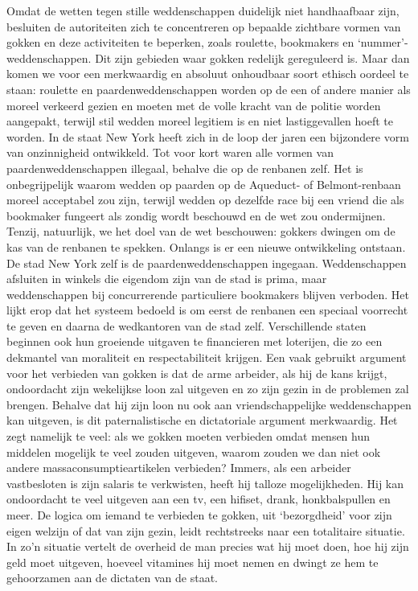 \documentclass[
  a5paper,
  smalldemyvopaper,10pt,twoside,onecolumn,openright,extrafontsizes,hidelinks]{memoir}
\begin{document}
Omdat de wetten tegen stille weddenschappen duidelijk niet handhaafbaar
zijn, besluiten de autoriteiten zich te concentreren op bepaalde
zichtbare vormen van gokken en deze activiteiten te beperken, zoals
roulette, bookmakers en `nummer'-weddenschappen. Dit zijn gebieden waar
gokken redelijk gereguleerd is. Maar dan komen we voor een merkwaardig
en absoluut onhoudbaar soort ethisch oordeel te staan: roulette en
paardenweddenschappen worden op de een of andere manier als moreel
verkeerd gezien en moeten met de volle kracht van de politie worden
aangepakt, terwijl stil wedden moreel legitiem is en niet lastiggevallen
hoeft te worden. In de staat New York heeft zich in de loop der jaren
een bijzondere vorm van onzinnigheid ontwikkeld. Tot voor kort waren
alle vormen van paardenweddenschappen illegaal, behalve die op de
renbanen zelf. Het is onbegrijpelijk waarom wedden op paarden op de
Aqueduct- of Belmont-renbaan moreel acceptabel zou zijn, terwijl wedden
op dezelfde race bij een vriend die als bookmaker fungeert als zondig
wordt beschouwd en de wet zou ondermijnen. Tenzij, natuurlijk, we het
doel van de wet beschouwen: gokkers dwingen om de kas van de renbanen te
spekken. Onlangs is er een nieuwe ontwikkeling ontstaan. De stad New
York zelf is de paardenweddenschappen ingegaan. Weddenschappen afsluiten
in winkels die eigendom zijn van de stad is prima, maar weddenschappen
bij concurrerende particuliere bookmakers blijven verboden. Het lijkt
erop dat het systeem bedoeld is om eerst de renbanen een speciaal
voorrecht te geven en daarna de wedkantoren van de stad zelf.
Verschillende staten beginnen ook hun groeiende uitgaven te financieren
met loterijen, die zo een dekmantel van moraliteit en respectabiliteit
krijgen. Een vaak gebruikt argument voor het verbieden van gokken is dat
de arme arbeider, als hij de kans krijgt, ondoordacht zijn wekelijkse
loon zal uitgeven en zo zijn gezin in de problemen zal brengen. Behalve
dat hij zijn loon nu ook aan vriendschappelijke weddenschappen kan
uitgeven, is dit paternalistische en dictatoriale argument merkwaardig.
Het zegt namelijk te veel: als we gokken moeten verbieden omdat mensen
hun middelen mogelijk te veel zouden uitgeven, waarom zouden we dan niet
ook andere massaconsumptieartikelen verbieden? Immers, als een arbeider
vastbesloten is zijn salaris te verkwisten, heeft hij talloze
mogelijkheden. Hij kan ondoordacht te veel uitgeven aan een tv, een
hifiset, drank, honkbalspullen en meer. De logica om iemand te verbieden
te gokken, uit `bezorgdheid' voor zijn eigen welzijn of dat van zijn
gezin, leidt rechtstreeks naar een totalitaire situatie. In zo'n
situatie vertelt de overheid de man precies wat hij moet doen, hoe hij
zijn geld moet uitgeven, hoeveel vitamines hij moet nemen en dwingt ze
hem te gehoorzamen aan de dictaten van de staat.
\end{document}
